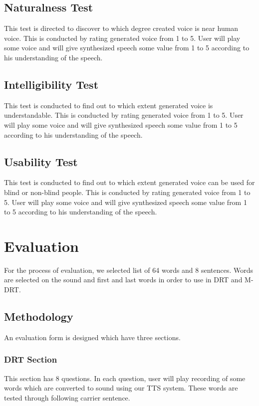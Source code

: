 \subsection{Naturalness Test}
This test is directed to discover to which degree created voice is near human voice. This is conducted by rating generated voice from 1 to 5. User will play some voice and will give synthesized speech some value from 1 to 5 according to his understanding of the speech.

\subsection{Intelligibility Test}
This test is conducted to find out to which extent generated voice is understandable. This is conducted by rating generated voice from 1 to 5. User will play some voice and will give synthesized speech some value from 1 to 5 according to his understanding of the speech.

\subsection{Usability Test}
This test is conducted to find out to which extent generated voice can be used for blind or non-blind people. This is conducted by rating generated voice from 1 to 5. User will play some voice and will give synthesized speech some value from 1 to 5 according to his understanding of the speech.


\section{Evaluation}
For the process of evaluation, we selected list of 64 words and 8 sentences. Words are selected on the sound and first and last words in order to use in DRT and M-DRT.

\subsection{Methodology}
An evaluation form is designed which have three sections. 


\subsubsection{DRT Section}

This section has 8 questions. In each question, user will play recording of some words which are converted to sound using our TTS system. These words are tested through following carrier sentence.

